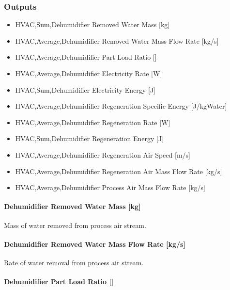 \subsubsection{Outputs}\label{outputs-008}

\begin{itemize}
\item
  HVAC,Sum,Dehumidifier Removed Water Mass {[}kg{]}
\item
  HVAC,Average,Dehumidifier Removed Water Mass Flow Rate {[}kg/s{]}
\item
  HVAC,Average,Dehumidifier Part Load Ratio {[]}
\item
  HVAC,Average,Dehumidifier Electricity Rate {[}W{]}
\item
  HVAC,Sum,Dehumidifier Electricity Energy {[}J{]}
\item
  HVAC,Average,Dehumidifier Regeneration Specific Energy {[}J/kgWater{]}
\item
  HVAC,Average,Dehumidifier Regeneration Rate {[}W{]}
\item
  HVAC,Sum,Dehumidifier Regeneration Energy {[}J{]}
\item
  HVAC,Average,Dehumidifier Regeneration Air Speed {[}m/s{]}
\item
  HVAC,Average,Dehumidifier Regeneration Air Mass Flow Rate {[}kg/s{]}
\item
  HVAC,Average,Dehumidifier Process Air Mass Flow Rate {[}kg/s{]}
\end{itemize}

\paragraph{Dehumidifier Removed Water Mass {[}kg{]}}\label{dehumidifier-removed-water-mass-kg}

Mass of water removed from process air stream.

\paragraph{Dehumidifier Removed Water Mass Flow Rate {[}kg/s{]}}\label{dehumidifier-removed-water-mass-flow-rate-kgs}

Rate of water removal from process air stream.

\paragraph{Dehumidifier Part Load Ratio {[]}}\label{dehumidifier-part-load-ratio}

